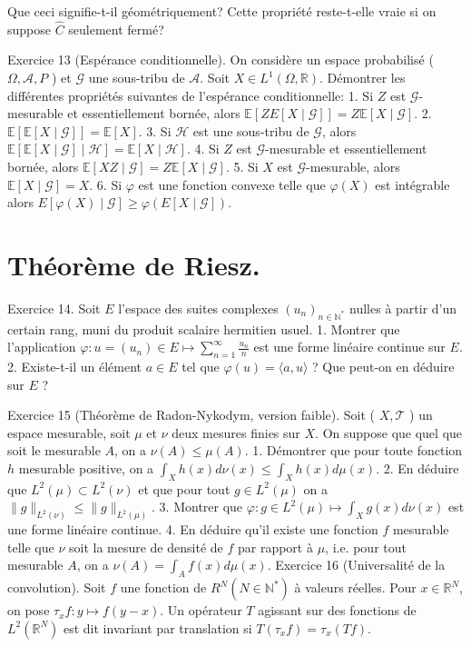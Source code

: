 \documentclass[12pt,a4paper]{article}
\begin{document}
Que ceci signifie-t-il géométriquement?
Cette propriété reste-t-elle vraie si on suppose \(\widehat{C}\) seulement fermé?

Exercice 13 (Espérance conditionnelle). On considère un espace probabilisé ( \(\Omega, \mathcal{A}, P\) ) et \(\mathcal{G}\) une sous-tribu de \(\mathcal{A}\). Soit \(X \in L^{1}(\Omega, \mathbb{R})\). Démontrer les différentes propriétés suivantes de l'espérance conditionnelle:
1. Si \(Z\) est \(\mathcal{G}\)-mesurable et essentiellement bornée, alors \(\mathbb{E}[Z E[X \mid \mathcal{G}]]=Z \mathbb{E}[X \mid \mathcal{G}]\).
2. \(\mathbb{E}[\mathbb{E}[X \mid \mathcal{G}]]=\mathbb{E}[X]\).
3. Si \(\mathcal{H}\) est une sous-tribu de \(\mathcal{G}\), alors \(\mathbb{E}[\mathbb{E}[X \mid \mathcal{G}] \mid \mathcal{H}]=\mathbb{E}[X \mid \mathcal{H}]\).
4. Si \(Z\) est \(\mathcal{G}\)-mesurable et essentiellement bornée, alors \(\mathbb{E}[X Z \mid \mathcal{G}]=Z \mathbb{E}[X \mid \mathcal{G}]\).
5. Si \(X\) est \(\mathcal{G}\)-mesurable, alors \(\mathbb{E}[X \mid \mathcal{G}]=X\).
6. Si \(\varphi\) est une fonction convexe telle que \(\varphi(X)\) est intégrable alors \(E[\varphi(X) \mid \mathcal{G}] \geqslant \varphi(E[X \mid \mathcal{G}])\).

\section*{Théorème de Riesz.}

Exercice 14. Soit \(E\) l'espace des suites complexes \(\left(u_{n}\right)_{n \in \mathbb{N}^{*}}\) nulles à partir d'un certain rang, muni du produit scalaire hermitien usuel.
1. Montrer que l'application \(\varphi: u=\left(u_{n}\right) \in E \mapsto \sum_{n=1}^{\infty} \frac{u_{n}}{n}\) est une forme linéaire continue sur \(E\).
2. Existe-t-il un élément \(a \in E\) tel que \(\varphi(u)=\langle a, u\rangle\) ? Que peut-on en déduire sur \(E\) ?

Exercice 15 (Théorème de Radon-Nykodym, version faible). Soit ( \(X, \mathcal{T}\) ) un espace mesurable, soit \(\mu\) et \(\nu\) deux mesures finies sur \(X\). On suppose que quel que soit le mesurable \(A\), on a \(\nu(A) \leqslant \mu(A)\).
1. Démontrer que pour toute fonction \(h\) mesurable positive, on a \(\int_{X} h(x) d \nu(x) \leqslant \int_{X} h(x) d \mu(x)\).
2. En déduire que \(L^{2}(\mu) \subset L^{2}(\nu)\) et que pour tout \(g \in L^{2}(\mu)\) on a \(\|g\|_{L^{2}(\nu)} \leqslant\|g\|_{L^{2}(\mu)}\).
3. Montrer que \(\varphi: g \in L^{2}(\mu) \mapsto \int_{X} g(x) d \nu(x)\) est une forme linéaire continue.
4. En déduire qu'il existe une fonction \(f\) mesurable telle que \(\nu\) soit la mesure de densité de \(f\) par rapport à \(\mu\), i.e. pour tout mesurable \(A\), on a \(\nu(A)=\int_{A} f(x) d \mu(x)\).
Exercice 16 (Universalité de la convolution). Soit \(f\) une fonction de \(R^{N}\left(N \in \mathbb{N}^{*}\right)\) à valeurs réelles. Pour \(x \in \mathbb{R}^{N}\), on pose \(\tau_{x} f: y \mapsto f(y-x)\). Un opérateur \(T\) agissant sur des fonctions de \(L^{2}\left(\mathbb{R}^{N}\right)\) est dit invariant par translation si \(T\left(\tau_{x} f\right)=\tau_{x}(T f)\).
\end{document}
